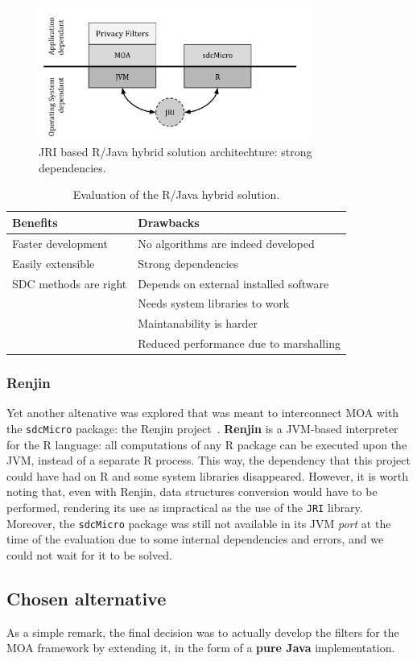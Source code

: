 \begin{figure}[h]
	\centering
	\includegraphics[width=0.8\textwidth]{figures/moa-ppsm-JRI-arch.pdf}
	\caption{JRI based R/Java hybrid solution architechture: strong dependencies.}
	\label{fig:ppsm-JRI-arch}
\end{figure}

\begin{table}
	\centering
	\begin{tabular}{ll}
		\hline
		\textbf{Benefits}     & \textbf{Drawbacks}                     \\ \hline
		Faster development    & No algorithms are indeed developed     \\
		Easily extensible     & Strong dependencies                    \\
		SDC methods are right & Depends on external installed software \\
		                      & Needs system libraries to work         \\
		                      & Maintanability is harder               \\
		                      & Reduced performance due to marshalling \\ \hline
	\end{tabular}
	\caption{Evaluation of the R/Java hybrid solution.}
	\label{table:JRI-pros-cons}
\end{table}

\subsubsection{Renjin}

Yet another altenative was explored that was meant to interconnect MOA with the \texttt{sdcMicro} package: the Renjin project~\citep{web:Renjin}. \textbf{Renjin} is a JVM-based interpreter for the R language: all computations of any R package can be executed upon the JVM, instead of a separate R process. This way, the dependency that this project could have had on R and some system libraries disappeared. However, it is worth noting that, even with Renjin, data structures conversion would have to be performed, rendering its use as impractical as the use of the \texttt{JRI} library. Moreover, the \texttt{sdcMicro} package was still not available in its JVM \textit{port} at the time of the evaluation due to some internal dependencies and errors, and we could not wait for it to be solved.

\subsection{Chosen alternative}

As a simple remark, the final decision was to actually develop the filters for the MOA framework by extending it, in the form of a \textbf{pure Java} implementation.